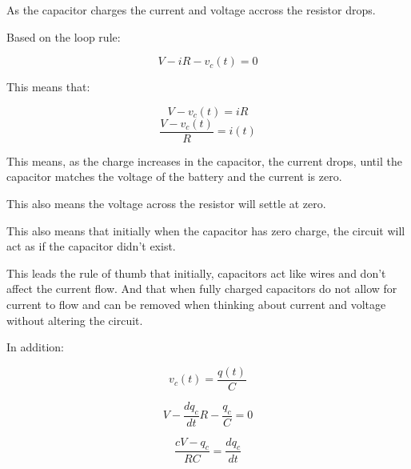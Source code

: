 \documentclass{report}
\begin{document}
\begin{description}
\begin{mdframed}
            As the capacitor charges the current and voltage accross
            the resistor drops.

            Based on the loop rule:

            \begin{displaymath}
                V - iR - v_c(t) = 0
            \end{displaymath}

            This means that:

            \begin{displaymath}
                V - v_c(t) = iR
            \end{displaymath}
            \begin{displaymath}
                \frac{V - v_c(t)}{R} = i(t)
            \end{displaymath}
            
            This means, as the charge increases in the
            capacitor, the current drops, until the capacitor
            matches the voltage of the battery and the
            current is zero.

            This also means the voltage across the resistor
            will settle at zero.

            This also means that initially when the capacitor
            has zero charge, the circuit will act
            as if the capacitor didn't exist.

            This leads the rule of thumb that initially,
            capacitors act like wires and don't
            affect the current flow. And that when
            fully charged capacitors do not allow for current
            to flow and can be removed when thinking about
            current and voltage without altering
            the circuit.

            In addition:

            \begin{displaymath}
                v_c(t) = \frac{q(t)}{C}
            \end{displaymath}

            \begin{displaymath}
                V - \frac{dq_c}{dt}R - \frac{q_c}{C} = 0
            \end{displaymath}
            
            \begin{displaymath}
                \frac{cV - q_c}{RC} = \frac{dq_c}{dt}
            \end{displaymath}


\end{mdframed}
\end{description}
\end{document}
